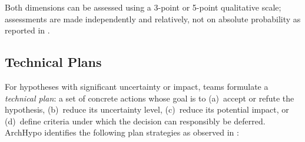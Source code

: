 Both dimensions can be assessed using a 3-point or 5-point qualitative scale;
assessments are made independently and relatively, not on absolute probability as reported in \citet{silva2024tse}.

\subsection{Technical Plans}
\label{subsec:archhypo-technical-plans}

For hypotheses with significant uncertainty or impact, teams formulate a
\emph{technical plan}: a set of concrete actions whose goal is to (a)~accept or refute
the hypothesis, (b)~reduce its uncertainty level, (c)~reduce its potential impact, or
(d)~define criteria under which the decision can responsibly be
deferred. ArchHypo identifies the following plan strategies as observed in \citet{silva2024ieeesw}:

